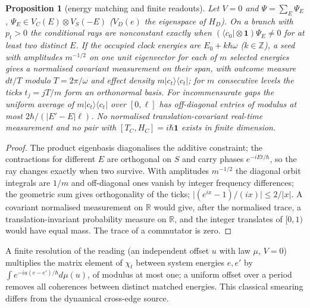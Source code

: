 \documentclass[aps,pra,onecolumn,superscriptaddress,nofootinbib,10pt]{revtex4-2}
\newtheorem{proposition}[theorem]{Proposition}
\theoremstyle{definition}
\theoremstyle{remark}
\newcommand{\R}{\mathbb{R}}
\newcommand{\Z}{\mathbb{Z}}
\begin{document}
\begin{proposition}[energy matching and finite readouts]\label{prop:cuspectrum}
Let $V=0$ and $\Psi=\sum_E\Psi_E$, $\Psi_E\in V_C(E)\otimes V_S(-E)$ ($V_D(e)$ the eigenspace of $H_D$).  On a branch with $p_t>0$ the
conditional rays are nonconstant exactly when $(\langle c_0\rvert\otimes\mathbf1)\Psi_E\ne0$ for at least two distinct $E$.  If the occupied
clock energies are $E_0+k\hbar\omega$ ($k\in\Z$), a seed with amplitudes $m^{-1/2}$ on one unit eigenvector for each of $m$
selected energies gives a normalised covariant measurement on their span, with outcome measure $dt/T$
modulo $T=2\pi/\omega$ and effect density $m\lvert c_t\rangle\langle c_t\rvert$; for $m$ consecutive levels the ticks $t_j=jT/m$ form an orthonormal
basis.  For incommensurate gaps the uniform average of $m\lvert c_t\rangle\langle c_t\rvert$ over $[0,\ell]$ has off-diagonal entries of modulus at
most $2\hbar/(\lvert E'-E\rvert\ell)$.  No normalised translation-covariant real-time measurement and no pair with
$[T_C,H_C]=i\hbar\mathbf1$ exists in finite dimension.
\end{proposition}
\begin{proof}
The product eigenbasis diagonalises the additive constraint; the contractions for different $E$ are
orthogonal on $S$ and carry phases $e^{-iEt/\hbar}$, so the ray changes exactly when two survive.  With amplitudes
$m^{-1/2}$ the diagonal orbit integrals are $1/m$ and off-diagonal ones vanish by integer frequency
differences; the geometric sum gives orthogonality of the ticks; $\lvert(e^{ix}-1)/(ix)\rvert\le2/\lvert x\rvert$.  A covariant
normalised measurement on $\R$ would give, after the normalised trace, a translation-invariant probability
measure on $\R$, and the integer translates of $[0,1)$ would have equal mass.  The trace of a commutator
is zero.
\end{proof}
\noindent A finite resolution of the reading (an independent offset $u$ with law $\mu$, $V=0$) multiplies the matrix
element of $\chi_t$ between system energies $e,e'$ by $\int e^{-iu(e-e')/\hbar}d\mu(u)$, of modulus at most one; a uniform offset over
a period removes all coherences between distinct matched energies.  This classical smearing differs
from the dynamical cross-edge source.
\end{document}
